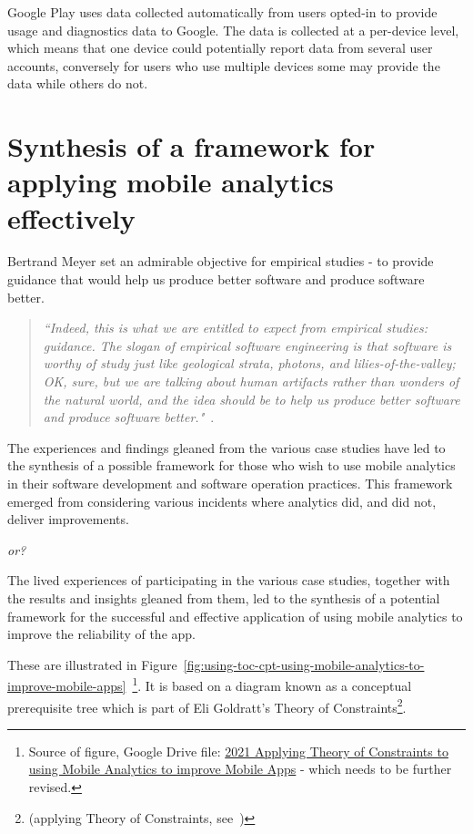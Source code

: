 Google Play uses data collected automatically from users opted-in to provide usage and diagnostics data to Google. The data is collected at a per-device level, which means that one device could potentially report data from several user accounts, conversely for users who use multiple devices some may provide the data while others do not.


\section{Synthesis of a framework for applying mobile analytics effectively}
Bertrand Meyer set an admirable objective for empirical studies - to provide guidance that would help us produce better software and produce software better. 
\begin{quote}
    \emph{``Indeed, this is what we are entitled to expect from empirical studies: guidance. The slogan of empirical software engineering is that software is worthy of study just like geological strata, photons, and lilies-of-the-valley; OK, sure, but we are talking about human artifacts rather than wonders of the natural world, and the idea should be to help us produce better software and produce software better."}~\citep{meyer2018_towards_empirical_answers_to_important_engineering_questions}.
\end{quote}

The experiences and findings gleaned from the various case studies have led to the synthesis of a possible framework for those who wish to use mobile analytics in their software development and software operation practices. This framework emerged from considering various incidents where analytics did, and did not, deliver improvements.

\textit{or?}

The lived experiences of participating in the various case studies, together with the results and insights gleaned from them, led to the synthesis of a potential framework for the successful and effective application of using mobile analytics to improve the reliability of the app. 

These are illustrated in Figure~\ref{fig:using-toc-cpt-using-mobile-analytics-to-improve-mobile-apps}~\footnote{Source of figure, Google Drive file:  \href{https://docs.google.com/document/d/16PaSFRVzg1b2Nykly8qzaTAHtJqtEwgrK754wuek53M/edit}{2021 Applying Theory of Constraints to using Mobile Analytics to improve Mobile Apps} - which needs to be further revised.}. It is based on a diagram known as a conceptual prerequisite tree which is part of Eli Goldratt's Theory of Constraints\footnote{(applying Theory of Constraints, see~\citep{goldratt2017_necessary_but_not_sufficient, lepore1999_deming_and_goldratt, scheinkopf1999_thinking_for_a_change})}. 

